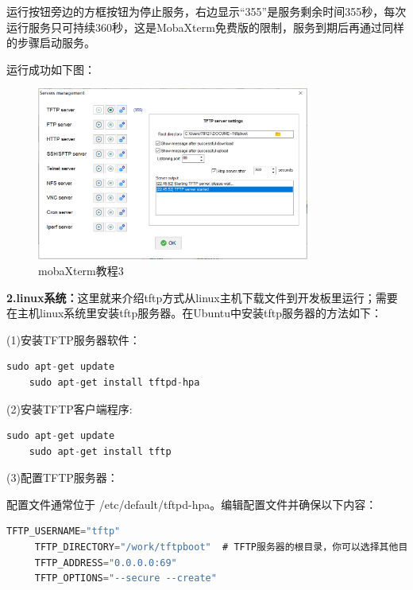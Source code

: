     运行按钮旁边的方框按钮为停止服务，右边显示“355”是服务剩余时间355秒，每次运行服务只可持续360秒，这是MobaXterm免费版的限制，服务到期后再通过同样的步骤启动服务。
   
    运行成功如下图：
    
    \begin{figure}[h]
    	\centering
    	\includegraphics[width=0.8\textwidth]{figures/08-01-mobaXterm教程3.png}
    	\caption{mobaXterm教程3}
    	\label{mobaXterm教程3}
    \end{figure}
    
   \textbf{ 2.linux系统：}这里就来介绍tftp方式从linux主机下载文件到开发板里运行；需要在主机linux系统里安装tftp服务器。在Ubuntu中安装tftp服务器的方法如下：
    
    (1)安装TFTP服务器软件：
   
   \begin{lstlisting}[language=rust]
    sudo apt-get update
    sudo apt-get install tftpd-hpa
   \end{lstlisting}
    
    (2)安装TFTP客户端程序:
    
    \begin{lstlisting}[language=rust]
    sudo apt-get update
    sudo apt-get install tftp
    \end{lstlisting}
    
     (3)配置TFTP服务器：
     
     配置文件通常位于 /etc/default/tftpd-hpa。编辑配置文件并确保以下内容：
     
     \begin{lstlisting}[language=rust]
     TFTP_USERNAME="tftp"
     TFTP_DIRECTORY="/work/tftpboot"  # TFTP服务器的根目录，你可以选择其他目录
     TFTP_ADDRESS="0.0.0.0:69"
     TFTP_OPTIONS="--secure --create"
     \end{lstlisting}
     

